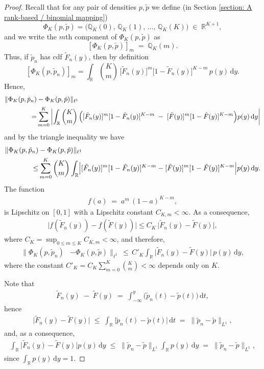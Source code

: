 \documentclass{article}
\begin{document}
\begin{proof} 
Recall that for any pair of densities \(p,\tilde p\) we define (in Section \ref{section: A rank-based / binomial mapping})
\[
\Phi_K(p,\tilde p)
=\bigl(\mathbb{Q}_K(0),\,\mathbb{Q}_K(1),\,\dots,\,\mathbb{Q}_K(K)\bigr)
\;\in\;\mathbb{R}^{K+1},
\]
and we write the \(m\)th component of $\Phi_{K}(p, \tilde{p})$ as
\[
[\Phi_K(p,\tilde p)]_m \;=\;\mathbb{Q}_K(m).
\]
Thus, if \(\tilde p_n\) has cdf \(\tilde F_n(y)\), then by definition
\[
[\Phi_K(p,\tilde p_n)]_m
=\int_{\mathbb{R}}
\binom{K}{m}\,
\bigl[\tilde F_n(y)\bigr]^m
\bigl[1-\tilde F_n(y)\bigr]^{K-m}
\,p(y)\,\mathrm{d}y.
\]
Hence,
\begin{align*}
\|\Phi_K(p,\tilde p_n) &- \Phi_K(p,\tilde p)\|_{\ell^1}\\
=&\sum_{m=0}^K
\left|
\int_{\mathbb{R}}
\binom{K}{m}\,
\Bigl(
[\tilde{F}_n(y)]^m [1 - \tilde{F}_n(y)]^{K-m}
\;-\;
[\tilde{F}(y)]^m [1 - \tilde{F}(y)]^{K-m}
\Bigr)
p(y)\,\mathrm{d}y
\right|
\end{align*}
and by the triangle inequality we have
\begin{align*}
\|\Phi_K(p,\tilde p_n) &- \Phi_K(p,\tilde p)\|_{\ell^1}
\,\,\\
\le&\sum_{m=0}^K \binom{K}{m}
\int_{\mathbb{R}}
\Bigl|
[\tilde{F}_n(y)]^m [1 - \tilde{F}_n(y)]^{K-m}
-
[\tilde{F}(y)]^m   [1 - \tilde{F}(y)]^{K-m}
\Bigr|
p(y)\,\mathrm{d}y.
\end{align*}
The function 
\begin{align*}
f(a) \;=\; a^m \,(1 - a)^{K-m},
\end{align*}
is Lipschitz on $[0,1]$ with a Lipschitz constant $C_{K,m}<\infty$. As a consequence,
\begin{align*}
\bigl|f(\tilde{F}_n(y)) - f(\tilde{F}(y))\bigr|
\le
C_K\,\bigl|\tilde{F}_n(y) - \tilde{F}(y)\bigr|,
\end{align*}
where $C_{K}=\sup_{0\leq m\leq K}C_{K,m}<\infty$, and therefore,
\begin{align}\label{eq1:thereomA1}
\|\Phi_K(p,\tilde p_n) &- \Phi_K(p,\tilde p)\|_{\ell^1}
\,\le\,
C'_K
\int_{\mathbb{R}}
\bigl|\tilde{F}_n(y) - \tilde{F}(y)\bigr|
\,p(y)\,\mathrm{d}y,
\end{align}
where the constant $C'_K = C_{K}\sum_{m=0}^{K}\binom{K}{m}<\infty$ depends only on $K$.

Note that
\begin{align*}
\tilde{F}_n(y) \;-\; \tilde{F}(y)
\;=\;
\int_{-\infty}^y \bigl(\tilde{p}_n(t) - \tilde{p}(t)\bigr)\,\mathrm{d}t,
\end{align*}
hence
\begin{align*}
\bigl|\tilde{F}_n(y) - \tilde{F}(y)\bigr|
\;\le\;
\int_{\mathbb{R}} \bigl|\tilde{p}_n(t) - \tilde{p}(t)\bigr|\,\mathrm{d}t
\;=\;
\|\tilde{p}_n - \tilde{p}\|_{L^1},
\end{align*}
and, as a consequence,
\begin{align}\label{eq2:thereomA1}
\int_{\mathbb{R}}
\bigl|\tilde{F}_n(y) - \tilde{F}(y)\bigr|
p(y)\,\mathrm{d}y
\;\le\;
\|\tilde{p}_n - \tilde{p}\|_{L^1}
\int_{\mathbb{R}} p(y)\,\mathrm{d}y
\;=\;
\|\tilde{p}_n - \tilde{p}\|_{L^1},
\end{align}
since $\int_{\mathbb{R}} p(y)\,\mathrm{d}y = 1$.


\end{proof}
\end{document}

